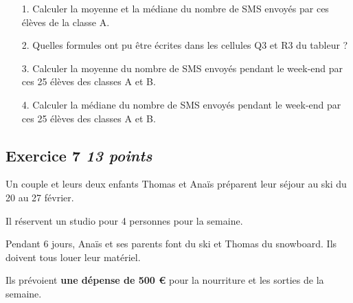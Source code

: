 \begin{enumerate}
    \item[1.] Calculer la moyenne et la médiane du nombre de SMS envoyés par ces élèves de la classe A.
    \item[2.] Quelles formules ont pu être écrites dans les cellules Q3 et R3 du tableur ?
    \item[3.] Calculer la moyenne du nombre de SMS envoyés pendant le week-end par ces 25 élèves des classes A et B.
    \item[4.] Calculer la médiane du nombre de SMS envoyés pendant le week-end par ces 25 élèves des classes A et B.
\end{enumerate}

\subsection*{Exercice 7 \hfill \textit{13 points}}

Un couple et leurs deux enfants Thomas et Anaïs préparent leur séjour au ski du 20 au 27 février.

Il réservent un studio pour 4 personnes pour la semaine.

Pendant 6 jours, Anaïs et ses parents font du ski et Thomas du snowboard. Ils doivent tous louer leur matériel.

Ils prévoient \textbf{une dépense de 500 \euro} pour la nourriture et les sorties de la semaine.

